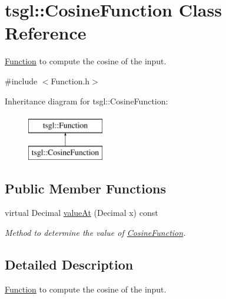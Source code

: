 \hypertarget{classtsgl_1_1_cosine_function}{\section{tsgl\-:\-:\-Cosine\-Function \-Class \-Reference}
\label{classtsgl_1_1_cosine_function}
}


\hyperlink{classtsgl_1_1_function}{\-Function} to compute the cosine of the input.  




{\ttfamily \#include $<$\-Function.\-h$>$}

\-Inheritance diagram for tsgl\-:\-:\-Cosine\-Function\-:\begin{figure}[H]
\begin{center}
\leavevmode
\includegraphics[height=2.000000cm]{classtsgl_1_1_cosine_function}
\end{center}
\end{figure}
\subsection*{\-Public \-Member \-Functions}
\begin{DoxyCompactItemize}
\item 
virtual \-Decimal \hyperlink{classtsgl_1_1_cosine_function_a69b67c247afe02895d35da9a99bc0ffd}{value\-At} (\-Decimal x) const 
\begin{DoxyCompactList}\small\item\em \-Method to determine the value of \hyperlink{classtsgl_1_1_cosine_function}{\-Cosine\-Function}. \end{DoxyCompactList}\end{DoxyCompactItemize}


\subsection{\-Detailed \-Description}
\hyperlink{classtsgl_1_1_function}{\-Function} to compute the cosine of the input. 

